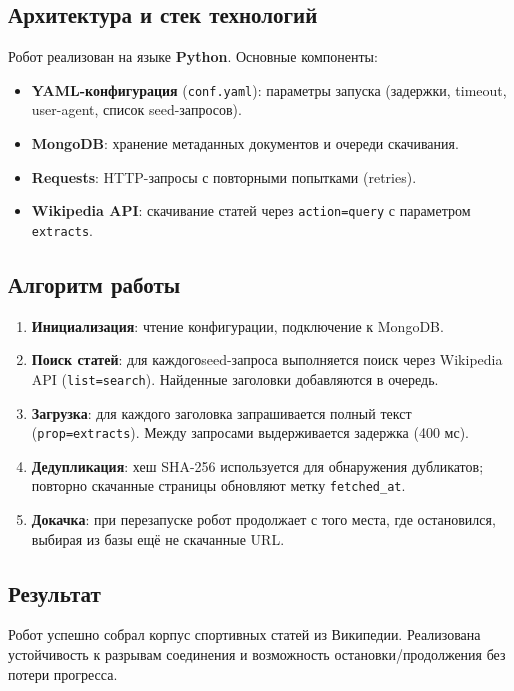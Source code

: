 \documentclass[a4paper,12pt]{article}
\begin{document}
\subsection{Архитектура и стек технологий}
Робот реализован на языке \textbf{Python}. Основные компоненты:
\begin{itemize}
    \item \textbf{YAML-конфигурация} (\texttt{conf.yaml}): параметры запуска (задержки, timeout, user-agent, список seed-запросов).
    \item \textbf{MongoDB}: хранение метаданных документов и очереди скачивания.
    \item \textbf{Requests}: HTTP-запросы с повторными попытками (retries).
    \item \textbf{Wikipedia API}: скачивание статей через \texttt{action=query} с параметром \texttt{extracts}.
\end{itemize}

\subsection{Алгоритм работы}
\begin{enumerate}
    \item \textbf{Инициализация}: чтение конфигурации, подключение к MongoDB.
    \item \textbf{Поиск статей}: для каждогоseed-запроса выполняется поиск через Wikipedia API (\texttt{list=search}). Найденные заголовки добавляются в очередь.
    \item \textbf{Загрузка}: для каждого заголовка запрашивается полный текст (\texttt{prop=extracts}). Между запросами выдерживается задержка (400 мс).
    \item \textbf{Дедупликация}: хеш SHA-256 используется для обнаружения дубликатов; повторно скачанные страницы обновляют метку \texttt{fetched\_at}.
    \item \textbf{Докачка}: при перезапуске робот продолжает с того места, где остановился, выбирая из базы ещё не скачанные URL.
\end{enumerate}

\subsection{Результат}
Робот успешно собрал корпус спортивных статей из Википедии. Реализована устойчивость к разрывам соединения и возможность остановки/продолжения без потери прогресса.

\end{document}
